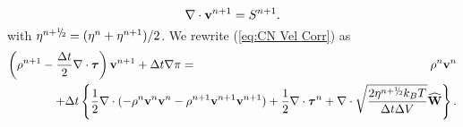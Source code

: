 \documentclass[final]{siamltex}
\newcommand{\sfrac}[2]{\mathchoice
  {\kern0em\raise.5ex\hbox{\the\scriptfont0 #1}\kern-.15em/
   \kern-.15em\lower.25ex\hbox{\the\scriptfont0 #2}}
  {\kern0em\raise.5ex\hbox{\the\scriptfont0 #1}\kern-.15em/
   \kern-.15em\lower.25ex\hbox{\the\scriptfont0 #2}}
  {\kern0em\raise.5ex\hbox{\the\scriptscriptfont0 #1}\kern-.2em/
   \kern-.15em\lower.25ex\hbox{\the\scriptscriptfont0 #2}}
  {#1\!/#2}}
\def\vb {{\bf v}}
\def\Wb {{\bf W}}
\def\taub {\boldsymbol{\tau}}
\def\half   {\frac{1}{2}}
\def\myhalf {\sfrac{1}{2}}
\begin{document}
\begin{equation}
\nabla\cdot\vb^{n+1} = S^{n+1}.
\end{equation}
with $\eta^{n+\myhalf} = (\eta^n + \eta^{n+1})/2$.
We rewrite (\ref{eq:CN Vel Corr}) as
\begin{eqnarray}
\left(\rho^{n+1} - \frac{\Delta t}{2}\nabla\cdot\taub\right)\vb^{n+1} + \Delta t\nabla\pi &=& \rho^n\vb^n\nonumber\\
&&\hspace{-1.75in}+ \Delta t\left\{\half\nabla\cdot(-\rho^n\vb^n\vb^n-\rho^{n+1}\vb^{n+1}\vb^{n+1}) + \half\nabla\cdot\taub^n + \nabla\cdot\sqrt{\frac{2\eta^{n+\myhalf} k_B T}{\Delta t\Delta V}}\widehat\Wb\right\}.
\end{eqnarray}
\end{document}
